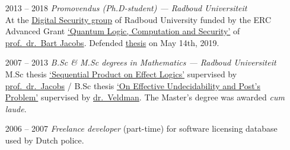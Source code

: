 \documentclass{article}
\newcommand\hsep{ {\color{gray}/} }
\begin{document}
\begin{itemize}
            
    \item[2013 -- 2018]  \emph{Promovendus (Ph.D-student) ---
        Radboud Universiteit}\\
        At the \href{http://www.ru.nl/ds/}{Digital Security group}
        of Radboud University funded by
        the ERC Advanced Grant \href{https://cordis.europa.eu/project/rcn/107285_en.html}{`Quantum Logic, Computation and Security'}
        of \href{http://www.cs.ru.nl/B.Jacobs/}{prof.~dr.~Bart Jacobs}.
            Defended
            \href{http://westerbaan.name/~bas/thesis.pdf}{thesis}
            on May 14th, 2019.
    \item[2007 -- 2013] \emph{B.Sc \& M.Sc degrees in Mathematics ---
                Radboud Universiteit} \\
        M.Sc thesis \href{www.ru.nl/publish/pages/813276/masterscriptie_bas_westerbaan.pdf}{`Sequential Product on Effect Logics'}
            supervised by \href{http://www.cs.ru.nl/B.Jacobs/}{prof.~dr.~Jacobs} \hsep
        B.Sc thesis \href{https://arxiv.org/abs/1409.1030}{`On Effective Undecidability and Post's Problem'}
            supervised by \href{http://www.ru.nl/wiskunde/@1039532/veldman-dhr-dr-(wim)/}{dr.~Veldman}.
        The Master's degree was awarded \emph{cum laude}.
    \item[2006 -- 2007] \emph{Freelance developer} (part-time)
        for software licensing database used by Dutch police.
\end{itemize}
\end{document}
